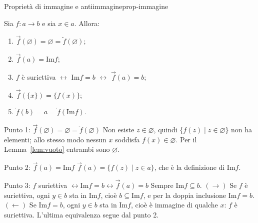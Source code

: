 \begin{concetto}
\begin{Proposizione}{Proprietà di immagine e antiimmagine}{prop-immagine}
    \begin{prerequisiti}
    \end{prerequisiti}
    Sia $f \colon a \to b$ e sia $x \in a$. Allora:
    \begin{enumerate}
        \item $\overrightarrow{f}(\varnothing) = \varnothing = \overleftarrow{f}(\varnothing)$;
        \item $\overrightarrow{f}(a) = \mathrm{Im} f$;
        \item $f$ è suriettiva $\leftrightarrow$ $\mathrm{Im} f = b$ $\leftrightarrow$ $\overrightarrow{f}(a) = b$;
        \item $\overrightarrow{f}(\{x\}) = \{f(x)\}$;
        \item $\overleftarrow{f}(b) = a = \overleftarrow{f}(\mathrm{Im} f)$.
    \end{enumerate}
\end{Proposizione}
\begin{dimostrazione}
    \begin{caso}{Punto 1: $\overrightarrow{f}(\varnothing) = \varnothing = \overleftarrow{f}(\varnothing)$}
        Non esiste $z \in \varnothing$, quindi $\{f(z) \mid z \in \varnothing\}$ non ha elementi; allo stesso modo nessun
        $x$ soddisfa $f(x) \in \varnothing$. Per il Lemma~\ref{lem:vuoto} entrambi sono $\varnothing$.
    \end{caso}
    \begin{caso}{Punto 2: $\overrightarrow{f}(a) = \mathrm{Im} f$}
        $\overrightarrow{f}(a) = \{f(z) \mid z \in a\}$, che è la definizione di $\mathrm{Im} f$.
    \end{caso}
    \begin{caso}{Punto 3: $f$ suriettiva $\leftrightarrow \mathrm{Im} f = b \leftrightarrow \overrightarrow{f}(a) = b$}
        Sempre $\mathrm{Im} f \subseteq b$. $(\rightarrow)$ Se $f$ è suriettiva, ogni $y \in b$ sta in $\mathrm{Im} f$, cioè
        $b \subseteq \mathrm{Im} f$, e per la doppia inclusione $\mathrm{Im} f = b$. $(\leftarrow)$ Se $\mathrm{Im} f = b$, ogni $y \in b$ sta in
        $\mathrm{Im} f$, cioè è immagine di qualche $x$: $f$ è suriettiva. L'ultima equivalenza segue dal punto 2.

\end{caso}
\end{dimostrazione}
\end{concetto}
